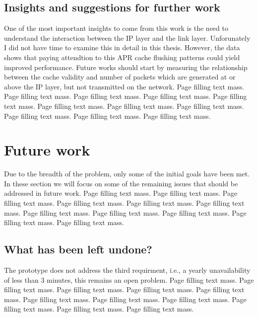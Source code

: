 \documentclass[12pt,a4paper,twoside,openright]{book}
\begin{document}
\subsection{Insights and suggestions for further work}
\label{ssec:insights-and-suggestions}

One of the most important insights to come from this work is the need to
understand the interaction between the IP layer and the link
layer. Unforunately I did not have time to examine this in detail in this
thesis. However, the data shows that paying attendtion to this APR cache
flushing patterns could yield improved performance. Future works should start
by measuring the relationship between the cache validity and number of packets
which are generated at or above the IP layer, but not transmitted on the
network.  Page filling text mass. Page filling text mass. Page filling text
mass. Page filling text mass. Page filling text mass. Page filling text
mass. Page filling text mass. Page filling text mass. Page filling text
mass. Page filling text mass. Page filling text mass.

\section{Future work}
\label{sec:future-work}


Due to the breadth of the problem, only some of the initial goals have been
met. In these section we will focus on some of the remaining issues that
should be addressed in future work. Page filling text mass. Page filling text
mass. Page filling text mass. Page filling text mass. Page filling text
mass. Page filling text mass. Page filling text mass. Page filling text
mass. Page filling text mass. Page filling text mass. Page filling text mass.

\subsection{What has been left undone?}
\label{what-has-been-left-undone}

The prototype does not address the third requirment, i.e., a yearly
unavailability of less than 3 minutes, this remains an open problem.  Page
filling text mass. Page filling text mass. Page filling text mass. Page
filling text mass. Page filling text mass. Page filling text mass. Page
filling text mass. Page filling text mass. Page filling text mass. Page
filling text mass. Page filling text mass.
\end{document}

